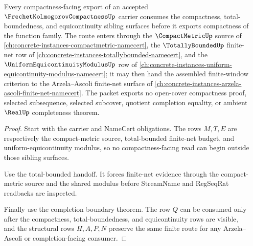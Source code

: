 \begin{theorem}
\label{thm:frechet-kolmogorov-compactness-orphan-route}
Every compactness-facing export of an accepted $\FrechetKolmogorovCompactnessUp$ carrier consumes the compactness, total-boundedness, and equicontinuity sibling surfaces before it exports compactness of the function family. The route enters through the $\CompactMetricUp$ source of \autoref{ch:concrete-instances-compactmetric-namecert}, the $\TotallyBoundedUp$ finite-net row of \autoref{ch:concrete-instances-totallybounded-namecert}, and the $\UniformEquicontinuityModulusUp$ row of \autoref{ch:concrete-instances-uniform-equicontinuity-modulus-namecert}; it may then hand the assembled finite-window criterion to the Arzela--Ascoli finite-net surface of \autoref{ch:concrete-instances-arzela-ascoli-finite-net-namecert}. The packet exports no open-cover compactness proof, selected subsequence, selected subcover, quotient completion equality, or ambient $\RealUp$ completeness theorem.
\end{theorem}
\begin{proof}
Start with the carrier and NameCert obligations. The rows $M,T,E$ are respectively the compact-metric source, total-bounded finite-net budget, and uniform-equicontinuity modulus, so no compactness-facing read can begin outside those sibling surfaces.

Use the total-bounded handoff. It forces finite-net evidence through the compact-metric source and the shared modulus before StreamName and RegSeqRat readbacks are inspected.

Finally use the completion boundary theorem. The row $Q$ can be consumed only after the compactness, total-boundedness, and equicontinuity rows are visible, and the structural rows $H,A,P,N$ preserve the same finite route for any Arzela--Ascoli or completion-facing consumer.
\end{proof}

